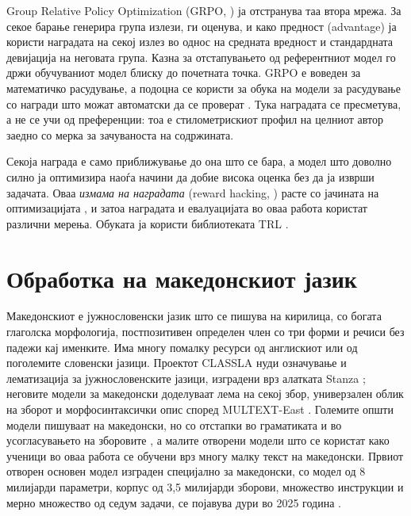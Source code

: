 Group Relative Policy Optimization (GRPO, \citealp{shao2024deepseekmath})
ја отстранува таа втора мрежа. За секое барање генерира група излези, ги
оценува, и како предност (advantage) ја користи наградата на секој излез
во однос на средната вредност и стандардната девијација на неговата група.
Казна за отстапувањето од референтниот модел го држи обучуваниот модел
блиску до почетната точка. GRPO е воведен за математичко расудување, а
подоцна се користи за обука на модели за расудување со награди што можат
автоматски да се проверат \citep{deepseek2025r1}. Тука наградата се
пресметува, а не се учи од преференции: тоа е стилометрискиот профил на
целниот автор заедно со мерка за зачуваноста на содржината.

Секоја награда е само приближување до она што се бара, а модел што доволно
силно ја оптимизира наоѓа начини да добие висока оценка без да ја изврши
задачата. Оваа \emph{измама на наградата} (reward hacking,
\citealp{skalse2022hacking}) расте со јачината на оптимизацијата
\citep{gao2023overoptimization}, и затоа наградата и евалуацијата во оваа
работа користат различни мерења. Обуката ја користи библиотеката TRL
\citep{vonwerra2020trl}.

\section{Обработка на македонскиот јазик}

Македонскиот е јужнословенски јазик што се пишува на кирилица, со богата
глаголска морфологија, постпозитивен определен член со три форми и речиси
без падежи кај именките. Има многу помалку ресурси од англискиот или од
поголемите словенски јазици. Проектот CLASSLA нуди означување и
лематизација за јужнословенските јазици, изградени врз алатката Stanza
\citep{qi2020stanza, ljubesic2019neural, tercon2023classla}; неговите
модели за македонски доделуваат лема на секој збор, универзален
облик на зборот и морфосинтаксички опис според MULTEXT-East
\citep{erjavec2012multext}. Големите општи модели пишуваат на македонски,
но со отстапки во граматиката и во усогласувањето на зборовите
\citep{arizankovska2024chatgpt}, а малите отворени модели што се користат
како ученици во оваа работа се обучени врз многу малку текст на
македонски.
Првиот отворен основен модел изграден специјално за македонски, со модел
од 8 милијарди параметри, корпус од 3,5 милијарди зборови, множество
инструкции и мерно множество од седум задачи, се појавува дури во 2025
година \citep{krsteski2025macedonian}.
